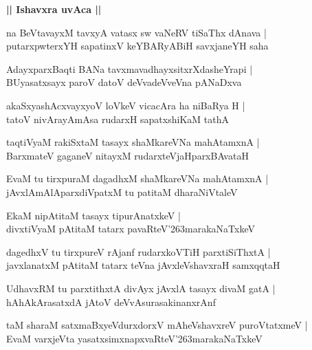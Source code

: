 \documentclass[twoside,12pt,openright]{book}
\def\S{\char'263}
\newcounter{shloka}[chapter]
\def\uvaca#1{\centerline{{\large\textbf{#1}}}}
\begin{document}
\uvaca{|| Ishavxra uvAca ||}

\begin{shloka}
na BeVtavayxM tavxyA vatasx sw vaNeRV tiSaThx dAnava |\\
putarxpwterxYH sapatinxV keYBARyABiH savxjaneYH saha 
\end{shloka}

\begin{shloka}
AdayxparxBaqti BANa tavxmavadhayxsitxrXdasheYrapi |\\
BUyasatxsayx paroV datoV deVvadeVveVna pANaDxva 
\end{shloka}

\begin{shloka}
akaSxyashAcxvayxyoV loVkeV vicacAra ha niBaRya H |\\
tatoV nivArayAmAsa rudarxH sapatxshiKaM tathA
\end{shloka}

\begin{shloka}
taqtiVyaM rakiSxtaM tasayx shaMkareVNa mahAtamxnA |\\
BarxmateV gaganeV nitayxM rudarxteVjaHparxBAvataH 
\end{shloka}

\begin{shloka}
EvaM tu tirxpuraM dagadhxM shaMkareVNa mahAtamxnA |\\
jAvxlAmAlAparxdiVpatxM tu patitaM dharaNiVtaleV 
\end{shloka}

\begin{shloka}
EkaM nipAtitaM tasayx tipurAnatxkeV |\\
divxtiVyaM pAtitaM tatarx pavaRteV\S marakaNaTxkeV  
\end{shloka}

\begin{shloka}
dagedhxV tu tirxpureV rAjanf rudarxkoVTiH parxtiSiThxtA |\\
javxlanatxM pAtitaM tatarx teVna jAvxleVshavxraH samxqqtaH 
\end{shloka}

\begin{shloka}
UdhavxRM tu parxtithxtA divAyx jAvxlA tasayx divaM gatA |\\
hAhAkArasatxdA jAtoV deVvAsurasakinanxrAnf 
\end{shloka}

\begin{shloka}
taM sharaM satxmaBxyeVdurxdorxV mAheVshavxreV puroVtatxmeV |\\
EvaM varxjeVta yasatxsimxnapxvaRteV\S marakaNaTxkeV
\end{shloka}
\end{document}
